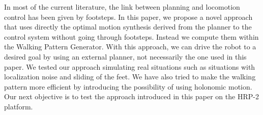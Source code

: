 In most of the current literature, the link between planning and locomotion control has been given by footsteps. In this paper, we propose a novel approach that uses directly the optimal motion synthesis derived from the planner to the control system without going through footsteps. Instead we compute them within the Walking Pattern Generator. With this approach, we can drive the robot to a desired goal by using an external planner, not necessarily the one used in this paper. We tested our approach simulating real situations such as situations with localization noise and sliding of the feet. We have also tried to make the walking pattern more efficient by introducing the possibility of using holonomic motion. Our next objective is to test the approach introduced in this paper on the HRP-2 platform.
